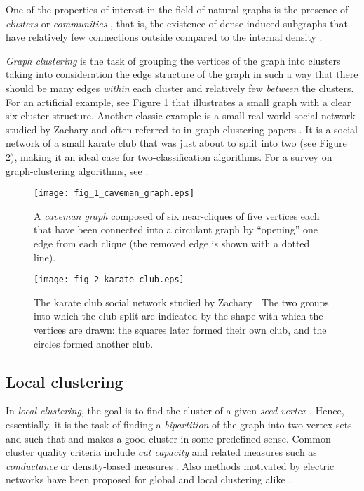 \documentclass{article}
\begin{document}
One of the properties of interest in the field of natural graphs is
the presence of \emph{clusters} or \emph{communities} \cite{NeGi03},
that is, the existence of dense induced subgraphs that have relatively
few connections outside compared to the internal density
\cite{Klei01}.

\emph{Graph clustering} is the task of grouping the vertices of the
graph into clusters taking into consideration the edge structure of
the graph in such a way that there should be many edges \emph{within}
each cluster and relatively few \emph{between} the clusters. For an
artificial example, see Figure \ref{fig:caveman} that illustrates a
small graph with a clear six-cluster structure. Another classic
example is a small real-world social network studied by Zachary
\cite{Zach77} and often referred to in graph clustering papers
\cite{WuHu04,OrSc05,Newm03}. It is a social network of a small karate
club that was just about to split into two (see Figure
\ref{fig:karate}), making it an ideal case for two-classification
algorithms. For a survey on graph-clustering algorithms, see
\cite{Scha07}.

\begin{figure}
\centerline{\texttt{[image: fig\_1\_caveman\_graph.eps]}}
  \caption{A \emph{caveman graph} \cite{Watt99} composed of six
    near-cliques of five vertices each that have been connected into a
    circulant graph by ``opening'' one edge from each clique (the
    removed edge is shown with a dotted line).}
\label{fig:caveman}
\end{figure}

\begin{figure}
\centerline{\texttt{[image: fig\_2\_karate\_club.eps]}}
\caption{The karate club social network studied by Zachary
  \cite{Zach77}. The two groups into which the club split are
  indicated by the shape with which the vertices are drawn: the
  squares later formed their own club, and the circles formed another
  club.}
\label{fig:karate}
\end{figure}

\subsection{Local clustering}

In \emph{local clustering}, the goal is to find the cluster of a given
\emph{seed vertex} . Hence, essentially, it is the task of
finding a \emph{bipartition} of the graph  into two vertex sets 
and  such that  and  makes a good cluster
in some predefined sense. Common cluster quality criteria include {\em
  cut capacity} and related measures such as \emph{conductance}
\cite{SiSc06} or density-based measures \cite{Scha05}. Also methods
motivated by electric networks have been proposed for global and local
clustering alike \cite{WuHu04,OrSc05,NeGi04}.
\end{document}

